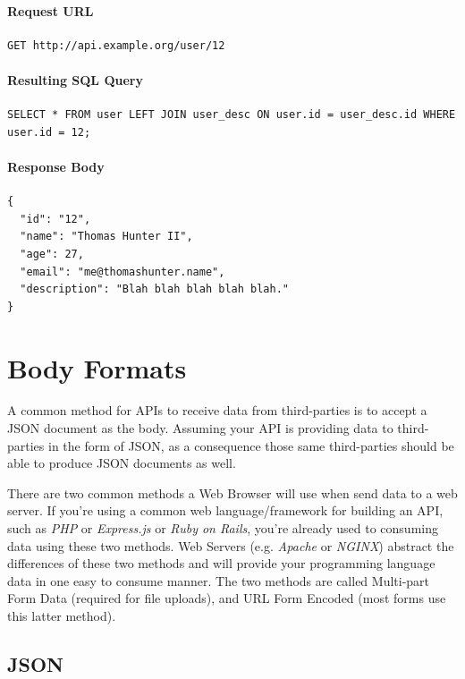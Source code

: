 \documentclass{book}
\begin{document}
\paragraph{\textbf{Request URL}}

\begin{verbatim}
GET http://api.example.org/user/12
\end{verbatim}

\paragraph{\textbf{Resulting SQL Query}}

\begin{verbatim}
SELECT * FROM user LEFT JOIN user_desc ON user.id = user_desc.id WHERE user.id = 12;
\end{verbatim}

\paragraph{\textbf{Response Body}}

\begin{verbatim}
{
  "id": "12",
  "name": "Thomas Hunter II",
  "age": 27,
  "email": "me@thomashunter.name",
  "description": "Blah blah blah blah blah."
}
\end{verbatim}


\section{Body Formats}

A common method for APIs to receive data from third-parties is to accept a JSON document as the body. Assuming your API is providing data to third-parties in the form of JSON, as a consequence those same third-parties should be able to produce JSON documents as well.

There are two common methods a Web Browser will use when send data to a web server. If you're using a common web language/framework for building an API, such as \emph{PHP} or \emph{Express.js} or \emph{Ruby on Rails}, you're already used to consuming data using these two methods. Web Servers (e.g. \emph{Apache} or \emph{NGINX}) abstract the differences of these two methods and will provide your programming language data in one easy to consume manner. The two methods are called Multi-part Form Data (required for file uploads), and URL Form Encoded (most forms use this latter method).

\subsection{JSON}
\end{document}
